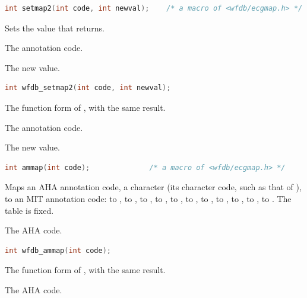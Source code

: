 \begin{lstlisting}[language=C,style=signature]
int setmap2(int code, int newval);    /* a macro of <wfdb/ecgmap.h> */
\end{lstlisting}
Sets the value that  returns.
\begin{params}
\item[code] The annotation code.
\item[newval] The new value.
\end{params}

\begin{lstlisting}[language=C,style=signature]
int wfdb_setmap2(int code, int newval);
\end{lstlisting}
The function form of , with the same result.
\begin{params}
\item[code] The annotation code.
\item[newval] The new value.
\end{params}

\begin{lstlisting}[language=C,style=signature]
int ammap(int code);              /* a macro of <wfdb/ecgmap.h> */
\end{lstlisting}
Maps an AHA annotation code, a character (its character code, such as that of
), to an MIT annotation code:  to ,
 to ,  to ,  to
,  to ,  to ,
 to ,  to ,  to
, \code{'['} to , \code{']'} to . The table
is fixed.
\begin{params}
\item[code] The AHA code.
\end{params}

\begin{lstlisting}[language=C,style=signature]
int wfdb_ammap(int code);
\end{lstlisting}
The function form of , with the same result.
\begin{params}
\item[code] The AHA code.
\end{params}

